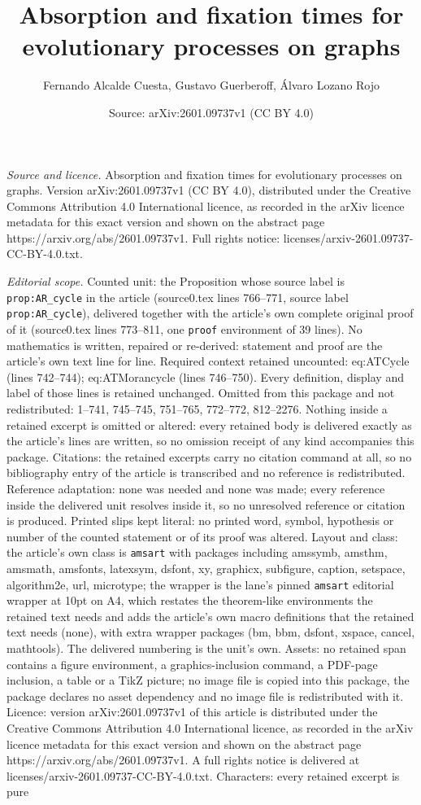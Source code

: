 \documentclass[10pt,a4paper]{amsart}
\title[Absorption and fixation times for evolutionary processes on ]{Absorption and fixation times for evolutionary processes on graphs}
\author{Fernando Alcalde Cuesta, Gustavo Guerberoff, \'Alvaro Lozano Rojo}
\date{Source: arXiv:2601.09737v1 (CC BY 4.0)}
\begin{document}
\maketitle

\noindent\emph{Source and licence.} Absorption and fixation times for evolutionary processes on graphs. Version arXiv:2601.09737v1 (CC BY 4.0), distributed under the Creative Commons Attribution 4.0 International licence, as recorded in the arXiv licence metadata for this exact version and shown on the abstract page https://arxiv.org/abs/2601.09737v1. Full rights notice: licenses/arxiv-2601.09737-CC-BY-4.0.txt.\par\smallskip

\noindent\textit{Editorial scope.} Counted unit: the Proposition whose source label is \texttt{prop:AR\_cycle} in the article (source0.tex lines 766--771, source label \texttt{prop:AR\_cycle}), delivered together with the article's own complete original proof of it (source0.tex lines 773--811, one \texttt{proof} environment of 39 lines). No mathematics is written, repaired or re-derived: statement and proof are the article's own text line for line. Required context retained uncounted: eq:ATCycle (lines 742--744); eq:ATMorancycle (lines 746--750). Every definition, display and label of those lines is retained unchanged. Omitted from this package and not redistributed: 1--741, 745--745, 751--765, 772--772, 812--2276. Nothing inside a retained excerpt is omitted or altered: every retained body is delivered exactly as the article's lines are written, so no omission receipt of any kind accompanies this package. Citations: the retained excerpts carry no citation command at all, so no bibliography entry of the article is transcribed and no reference is redistributed. Reference adaptation: none was needed and none was made; every reference inside the delivered unit resolves inside it, so no unresolved reference or citation is produced. Printed slips kept literal: no printed word, symbol, hypothesis or number of the counted statement or of its proof was altered. Layout and class: the article's own class is \texttt{amsart} with packages including amssymb, amsthm, amsmath, amsfonts, latexsym, dsfont, xy, graphicx, subfigure, caption, setspace, algorithm2e, url, microtype; the wrapper is the lane's pinned \texttt{amsart} editorial wrapper at 10pt on A4, which restates the theorem-like environments the retained text needs and adds the article's own macro definitions that the retained text needs (none), with extra wrapper packages (bm, bbm, dsfont, xspace, cancel, mathtools). The delivered numbering is the unit's own. Assets: no retained span contains a figure environment, a graphics-inclusion command, a PDF-page inclusion, a table or a TikZ picture; no image file is copied into this package, the package declares no asset dependency and no image file is redistributed with it. Licence: version arXiv:2601.09737v1 of this article is distributed under the Creative Commons Attribution 4.0 International licence, as recorded in the arXiv licence metadata for this exact version and shown on the abstract page https://arxiv.org/abs/2601.09737v1. A full rights notice is delivered at licenses/arxiv-2601.09737-CC-BY-4.0.txt. Characters: every retained excerpt is pure 
\end{document}
